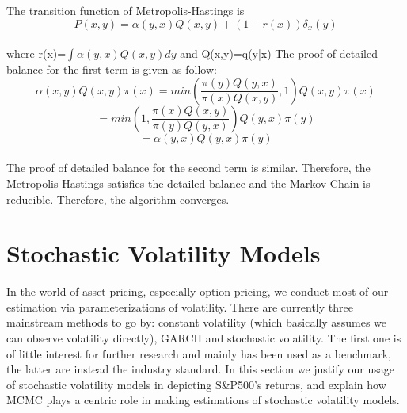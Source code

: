 \documentclass[letterpaper]{article}
\begin{document}
The transition function of Metropolis-Hastings is 
\begin{equation}
P(x,y)=\alpha(y,x)Q(x,y)+(1-r(x))\delta_{x}(y)
\end{equation} \\
where r(x)=$\int\alpha(y,x)Q(x,y)dy$ and Q(x,y)=q(y|x)
The proof of detailed balance for the first term is given as follow:
\begin{equation}
\alpha(x,y)Q(x,y)\pi(x)=min(\frac{\pi(y)Q(y,x)}{\pi(x)Q(x,y)},1) Q(x,y)\pi(x)
\end{equation}
\begin{equation}
=min(1,\frac{\pi(x)Q(x,y)}{\pi(y)Q(y,x)}) Q(y,x)\pi(y)
\end{equation}
\begin{equation}
=\alpha(y,x)Q(y,x)\pi(y)
\end{equation} \\
The proof of detailed balance for the second term is similar. Therefore, the Metropolis-Hastings satisfies the detailed balance and the Markov Chain is reducible. Therefore, the algorithm converges.  

\section{Stochastic Volatility Models}
In the world of asset pricing, especially option pricing, we conduct most of our estimation via parameterizations of volatility. There are currently three mainstream methods to go by: constant volatility (which basically assumes we can observe volatility directly), GARCH and stochastic volatility. The first one is of little interest for further research and mainly has been used as a benchmark, the latter are instead the industry standard. In this section we justify our usage of stochastic volatility models in depicting S\&P500's returns, and explain how MCMC plays a centric role in making estimations of stochastic volatility models.
\end{document}

